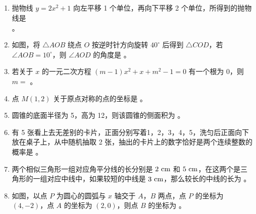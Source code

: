 \documentclass{ExamJHSMath}
\begin{document}
\subsection{}
\begin{enumerate}[resume,ref={\arabic*}]

  \item 抛物线 $y=2x^{2}+1$ 向左平移 1 个单位，再向下平移 2 个单位，所得到的抛物线是 \\ \blank[4]{}。
  
  \item 如图，将 $\triangle AOB$ 绕点 $O$ 按逆时针方向旋转 $40^\circ$ 后得到 $\triangle COD$，若 $\angle AOB=10^\circ$，则 $\angle AOD$ 的角度是 \blank{}。
  
  \item 若关于 $x$ 的一元二次方程 $(m-1)x^{2}+x+m^{2}-1=0$ 有一个根为 0，则 $m=$ \blank{}。
  
  \item 点 $M(1,2)$ 关于原点对称的点的坐标是 \blank{}。
  
  \item 圆锥的底面半径为 5，高为 12，则该圆锥的侧面积为 \blank{}。
  
  \item 有 5 张看上去无差别的卡片，正面分别写着1，2，3，4，5，洗匀后正面向下放在桌子上，从中随机抽取 2 张，抽出的卡片上的数字恰好是两个连续整数的概率是 \blank{}。
  
  \item 两个相似三角形一组对应角平分线的长分别是 $\rm{2\ cm}$ 和 $\rm{5\ cm}$，在这两个是三角形的一组对应中线中，如果较短的中线是 $\rm{3\ cm}$，那么较长的中线的长为 \blank{}。
  
  \item 如图，以点 $P$ 为圆心的圆弧与 $x$ 轴交于 $A$，$B$ 两点，点 $P$ 的坐标为 $(4,-2)$，点 $A$ 的坐标为 $(2,0)$，则点 $B$ 的坐标为 \blank{}。
\end{enumerate}
\end{document}
